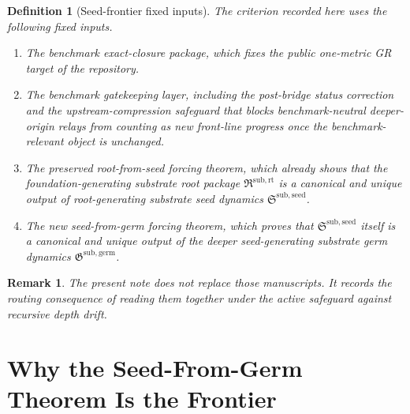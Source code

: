 \documentclass[11pt]{article}
\newcommand{\RootPackage}{\mathfrak R^{\mathrm{sub,rt}}}
\newcommand{\SeedPackage}{\mathfrak S^{\mathrm{sub,seed}}}
\newcommand{\GermPackage}{\mathfrak G^{\mathrm{sub,germ}}}
\newtheorem{definition}{Definition}
\newtheorem{remark}{Remark}
\begin{document}
\begin{definition}[Seed-frontier fixed inputs]
The criterion recorded here uses the following fixed inputs.
\begin{enumerate}
    \item The benchmark exact-closure package, which fixes the public one-metric GR target of the repository.
    \item The benchmark gatekeeping layer, including the post-bridge status correction and the upstream-compression safeguard that blocks benchmark-neutral deeper-origin relays from counting as new front-line progress once the benchmark-relevant object is unchanged.
    \item The preserved root-from-seed forcing theorem, which already shows that the foundation-generating substrate root package \(\RootPackage\) is a canonical and unique output of root-generating substrate seed dynamics \(\SeedPackage\).
    \item The new seed-from-germ forcing theorem, which proves that \(\SeedPackage\) itself is a canonical and unique output of the deeper seed-generating substrate germ dynamics \(\GermPackage\).
\end{enumerate}
\end{definition}

\begin{remark}
The present note does not replace those manuscripts. It records the routing consequence of reading them together under the active safeguard against recursive depth drift.
\end{remark}

\section{Why the Seed-From-Germ Theorem Is the Frontier}
\end{document}
